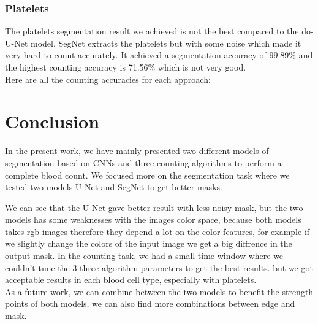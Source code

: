 \documentclass[conference]{IEEEtran}
\begin{document}
\subsubsection{Platelets}
\hspace{\parindent}
The platelets segmentation result we achieved is not the best compared to the do-U-Net model. SegNet extracts the platelets but with some noise which made it very hard to count accurately.
It achieved a segmentation accuracy of 99.89\% and the highest counting accuracy is 71.56\% which is not very good.\\
Here are all the counting accuracies for each approach:

\section{Conclusion}

In the present work, we have mainly presented two different models of segmentation based on CNNs and three counting algorithms to perform a complete blood count.
We focused more on the segmentation task where  we tested two models U-Net and SegNet to get better masks. 

We can see that the U-Net gave better result with less noisy mask, but the two models has some weaknesses with the images color space, because both models takes rgb images therefore they depend a lot on the color features, for example if we slightly change the colors of the input image we get a big diffrence in the output mask.
In the counting task, we had a small time window where we couldn't tune the 3 three algorithm parameters to get the best results. but we got acceptable results in each blood cell type, especially with platelets.\\

As a future work, we can combine between the two models to benefit the strength points of both models, we can also find more combinations between edge and mask.



\end{document}
